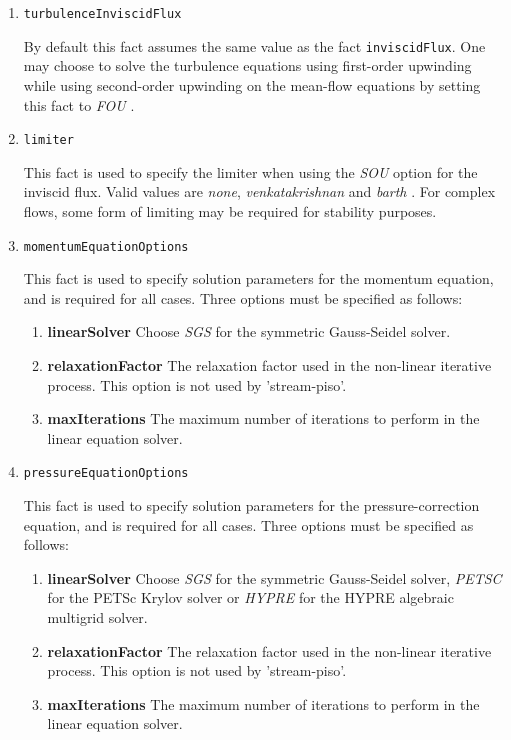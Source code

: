 \documentclass{article}
\begin{document}
\begin{enumerate}
\item{\tt turbulenceInviscidFlux}

By default this fact assumes the same value as the fact {\tt inviscidFlux}.
One may choose to solve the turbulence equations using first-order upwinding
while using second-order upwinding on the mean-flow equations by setting this
fact to \emph{FOU} .

\item{\tt limiter}

This fact is used to specify the limiter when using the \emph{SOU} option for
the inviscid flux. Valid values are \emph{none}, \emph{venkatakrishnan} and
\emph{barth} . For complex flows, some form of limiting may be required for
stability purposes.

\item{\tt momentumEquationOptions}

This fact is used to specify solution parameters for the momentum equation,
and is required for all cases.  Three options must be specified as follows:
  \begin{enumerate}
     \item{\bf linearSolver} Choose \emph{SGS} for the symmetric Gauss-Seidel
solver.
     \item{\bf relaxationFactor} The relaxation factor used in the non-linear
iterative process. This option is not used by 'stream-piso'.
     \item{\bf maxIterations} The maximum number of iterations to perform in
the linear equation solver.
  \end{enumerate}

\item{\tt pressureEquationOptions}

This fact is used to specify solution parameters for the pressure-correction
equation, and is required for all cases. Three options must be specified as
follows:
  \begin{enumerate}
     \item{\bf linearSolver} Choose \emph{SGS} for the symmetric Gauss-Seidel
solver, \emph{PETSC} for the PETSc Krylov solver or \emph{HYPRE} for the HYPRE
algebraic multigrid solver.
     \item{\bf relaxationFactor} The relaxation factor used in the non-linear
iterative process. This option is not used by 'stream-piso'.
     \item{\bf maxIterations} The maximum number of iterations to perform in
the linear equation solver.
  \end{enumerate}


\end{enumerate}
\end{document}
